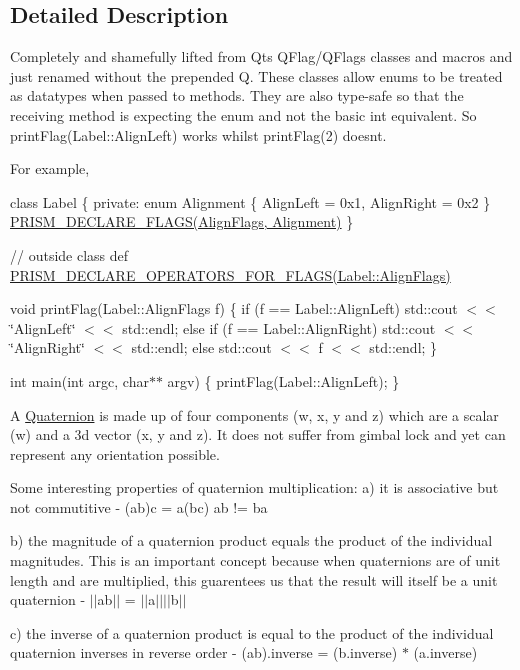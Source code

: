 \subsection{Detailed Description}
Completely and shamefully lifted from Qt\textquotesingle{}s Q\+Flag/\+Q\+Flags classes and macros and just renamed without the prepended \textquotesingle{}Q\textquotesingle{}. These classes allow enums to be treated as datatypes when passed to methods. They are also type-\/safe so that the receiving method is expecting the enum and not the basic int equivalent. So print\+Flag(\+Label\+::\+Align\+Left) works whilst print\+Flag(2) doesn\textquotesingle{}t.

For example,

class Label \{ private\+: enum Alignment \{ Align\+Left = 0x1, Align\+Right = 0x2 \} \hyperlink{_flags_8h_aa5aa2c9827ab949836e20999b9a068ec}{P\+R\+I\+S\+M\+\_\+\+D\+E\+C\+L\+A\+R\+E\+\_\+\+F\+L\+A\+G\+S(\+Align\+Flags, Alignment)} \}

// outside class def \hyperlink{_flags_8h_ae8aabb683a18b872a4449769b82e8e15}{P\+R\+I\+S\+M\+\_\+\+D\+E\+C\+L\+A\+R\+E\+\_\+\+O\+P\+E\+R\+A\+T\+O\+R\+S\+\_\+\+F\+O\+R\+\_\+\+F\+L\+A\+G\+S(\+Label\+::\+Align\+Flags)}

void print\+Flag(\+Label\+::\+Align\+Flags f) \{ if (f == Label\+::\+Align\+Left) std\+::cout $<$$<$ \char`\"{}\+Align\+Left\char`\"{} $<$$<$ std\+::endl; else if (f == Label\+::\+Align\+Right) std\+::cout $<$$<$ \char`\"{}\+Align\+Right\char`\"{} $<$$<$ std\+::endl; else std\+::cout $<$$<$ f $<$$<$ std\+::endl; \}

int main(int argc, char$\ast$$\ast$ argv) \{ print\+Flag(\+Label\+::\+Align\+Left); \}

A \hyperlink{classprism_1_1_quaternion}{Quaternion} is made up of four components (w, x, y and z) which are a scalar (w) and a 3d vector (x, y and z). It does not suffer from gimbal lock and yet can represent any orientation possible.

Some interesting properties of quaternion multiplication\+: a) it is associative but not commutitive -\/ (ab)c = a(bc) ab != ba

b) the magnitude of a quaternion product equals the product of the individual magnitudes. This is an important concept because when quaternions are of unit length and are multiplied, this guarentees us that the result will itself be a unit quaternion -\/ $\vert$$\vert$ab$\vert$$\vert$ = $\vert$$\vert$a$\vert$$\vert$$\vert$$\vert$b$\vert$$\vert$

c) the inverse of a quaternion product is equal to the product of the individual quaternion inverses in reverse order -\/ (ab).inverse = (b.\+inverse) $\ast$ (a.\+inverse)

